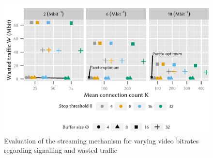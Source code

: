 \begin{figure}
  \centering
  \includegraphics{application/lte_video/trade_offs/figures/connections2lostData}
  \caption{Evaluation of the streaming mechanism for varying video bitrates regarding signalling and wasted traffic}
  \label{fig:application:lte_video:numerical_evaluation:trade_offs:connections2lostData}
\end{figure}